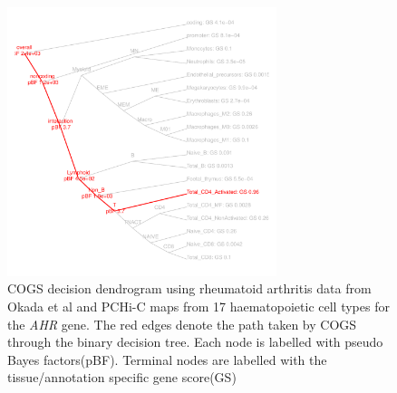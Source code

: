 \documentclass[a4paper,11pt]{report}
\begin{document}
\begin{figure}[ht]
\includegraphics[width=0.7\textwidth]{AHR_dend.pdf}
\caption{COGS decision dendrogram using rheumatoid arthritis data from Okada et al and PCHi-C maps from 17 haematopoietic cell types for the \textit{AHR} gene. The red edges denote the path taken by COGS through the binary decision tree. Each node is labelled with pseudo Bayes factors(pBF). Terminal nodes are labelled with the tissue/annotation specific gene score(GS) }
\label{fig:AHR_dend}
\end{figure}


\end{document}
